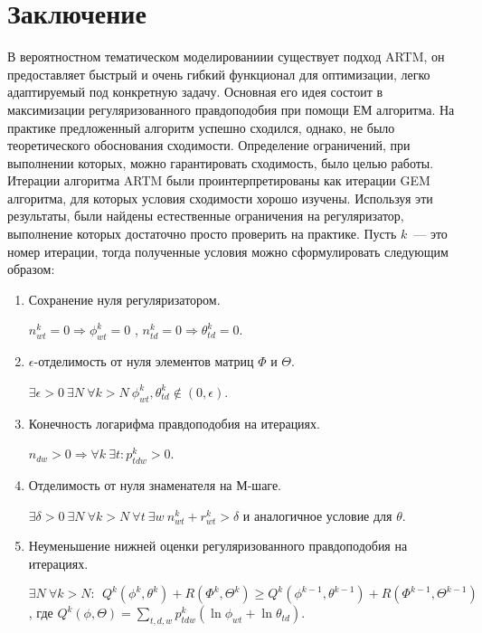 \documentclass[12pt, twoside]{article}
\begin{document}
\section{Заключение}
	В вероятностном тематическом моделированиии существует подход ARTM, он предоставляет быстрый и очень гибкий функционал для оптимизации, легко адаптируемый под конкретную задачу. Основная его идея состоит в максимизации регуляризованного правдоподобия при помощи ЕМ алгоритма. На практике предложенный алгоритм успешно сходился, однако, не было теоретического обоснования сходимости. Определение ограничений, при выполнении которых, можно гарантировать сходимость, было целью  работы. Итерации алгоритма ARTM были проинтерпретированы как итерации GEM алгоритма, для которых условия сходимости хорошо изучены. Используя эти результаты, были найдены естественные ограничения на регуляризатор, выполнение которых достаточно просто проверить на практике. Пусть $k$~--- это номер итерации, тогда полученные условия можно сформулировать следующим образом:
\begin{enumerate}
\item Сохранение нуля регуляризатором.
\smallskip

$ n^k_{wt} = 0 \Rightarrow \phi^k_{wt} = 0$ , $n^k_{td} = 0 \Rightarrow \theta^k_{td} = 0$.
\item $\epsilon$-отделимость от нуля элементов матриц $\Phi$ и $\Theta$.
\smallskip

$\exists \epsilon>0\ \exists N\ \forall k > N\ \phi^k_{wt}, \theta^k_{td} \notin (0, \epsilon)$. 
\item  Конечность логарифма правдоподобия на итерациях.
\smallskip

$ n_{dw}>0 \Rightarrow \forall k\ \exists t\colon p^k_{tdw} > 0$.
\item Отделимость от нуля знаменателя на М-шаге.
\smallskip

$\exists \delta >0\ \exists N\ \forall k > N \ \forall t\ \exists w\  n^k_{wt} + r^k_{wt} > \delta$ и аналогичное условие для $\theta$. 
\item Неуменьшение нижней оценки регуляризованного правдоподобия на итерациях.
\smallskip

$\exists N\ \forall k > N\colon\ \ Q^k (\phi^k, \theta^k)+ R(\Phi^k, \Theta^k) \geq Q^k(\phi^{k-1}, \theta^{k-1}) + R(\Phi^{k-1}, \Theta^{k-1})$, где $Q^k(\phi, \Theta) = \sum\limits_{t,d,w} p^k_{tdw} (\ln \phi_{wt} + \ln \theta_{td})$.
\end{enumerate}
\end{document}
